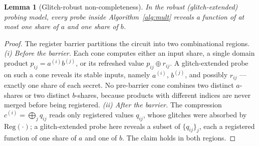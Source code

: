 \documentclass[lettersize,journal]{IEEEtran}
\newtheorem{lemma}{Lemma}
\newcommand{\share}[2]{#1^{(#2)}}
\begin{document}
\begin{lemma}[Glitch-robust non-completeness]
\label{lem:noncomp}
In the robust (glitch-extended) probing model, every probe inside
Algorithm~\ref{alg:mult} reveals a function of at most one share of $a$ and one
share of $b$.
\end{lemma}
\begin{proof}
The register barrier partitions the circuit into two combinational regions.
\emph{(i) Before the barrier.} Each cone computes either an input share, a
single domain product $p_{ij}=\share{a}{i}\share{b}{j}$, or its refreshed value
$p_{ij}\oplus r_{ij}$. A glitch-extended probe on such a cone reveals its stable
inputs, namely $\share{a}{i}$, $\share{b}{j}$, and possibly $r_{ij}$ --- exactly
one share of each secret. No pre-barrier cone combines two distinct $a$-shares
or two distinct $b$-shares, because products with different indices are never
merged before being registered. \emph{(ii) After the barrier.} The compression
$\share{c}{i}=\bigoplus_j q_{ij}$ reads only registered values $q_{ij}$, whose
glitches were absorbed by $\mathrm{Reg}(\cdot)$; a glitch-extended probe here
reveals a subset of $\{q_{ij}\}_j$, each a registered function of one share of
$a$ and one of $b$. The claim holds in both regions.
\end{proof}
\end{document}
